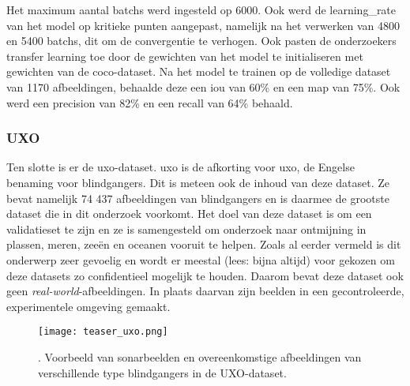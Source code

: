 Het maximum aantal \glspl{batch} werd ingesteld op 6000. Ook werd de \gls{learning_rate} van het model op kritieke punten aangepast, namelijk na het verwerken van 4800 en 5400 \glspl{batch}, dit om de convergentie te verhogen. Ook pasten de onderzoekers transfer learning toe door de gewichten van het model te initialiseren met gewichten van de \gls{coco}-dataset. Na het model te trainen op de volledige dataset van 1170 afbeeldingen, behaalde deze een \gls{iou} van 60\% en een \gls{map} van 75\%. Ook werd een \gls{precision} van 82\% en een \gls{recall} van 64\% behaald. \autocite{Pessanha_Santos_2024}

\subsubsection{UXO}

Ten slotte is er de \acrshort{uxo}-dataset. \acrshort{uxo} is de afkorting voor \acrlong{uxo}, de Engelse benaming voor \glspl{blindganger}. Dit is meteen ook de inhoud van deze dataset. Ze bevat namelijk 74 437 afbeeldingen van \glspl{blindganger} en is daarmee de grootste dataset die in dit onderzoek voorkomt. Het doel van deze dataset is om een validatieset te zijn en ze is samengesteld om onderzoek naar ontmijning in plassen, meren, zeeën en oceanen vooruit te helpen. Zoals al eerder vermeld is dit onderwerp zeer gevoelig en wordt er meestal (lees: bijna altijd) voor gekozen om deze datasets zo confidentieel mogelijk te houden. Daarom bevat deze dataset ook geen \emph{real-world}-afbeeldingen. In plaats daarvan zijn beelden in een gecontroleerde, experimentele omgeving gemaakt. \autocite{Dahn_2024_UXO}

\begin{figure}[H]
    \centering
    \texttt{[image: teaser\_uxo.png]}
    \caption[Voorbeeld van sonarbeelden \& afbeeldingen in de UXO-dataset]{\label{fig:uxo_teaser}. Voorbeeld van sonarbeelden en overeenkomstige afbeeldingen van verschillende type \glspl{blindganger} in de UXO-dataset. \autocite{Dahn_2024_UXO}}
\end{figure}

